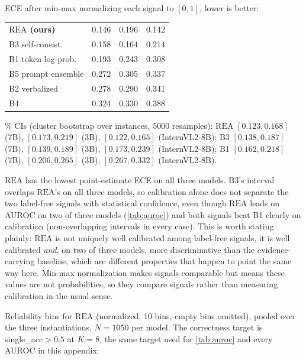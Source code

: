 \documentclass[11pt]{article}
\newcommand{\rea}{\mathrm{REA}}
\begin{document}
ECE after min-max normalizing each signal to $[0,1]$, lower is better:

\begin{center}
\footnotesize
\setlength{\tabcolsep}{3pt}
\begin{tabular}{@{}l S[table-format=1.3] S[table-format=1.3] S[table-format=1.3]@{}}
\toprule
{} & {} & {} & {} \\
\midrule
\textbf{$\rea$ (ours)} & 0.146 & 0.196 & 0.142 \\
B3 self-consist.    & 0.158 & 0.164 & 0.214 \\
B1 token log-prob.  & 0.193 & 0.243 & 0.308 \\
B5 prompt ensemble  & 0.272 & 0.305 & 0.337 \\
B2 verbalized       & 0.278 & 0.290 & 0.341 \\
B4 \citeauthor{khan2024consistency} & 0.324 & 0.330 & 0.388 \\
\bottomrule
\end{tabular}
\end{center}

\% CIs (cluster bootstrap over instances, 5000 resamples): $\rea$ $[0.123,0.168]$ (7B), $[0.173,0.219]$ (3B), $[0.122,0.165]$ (InternVL2-8B); B3 $[0.138,0.187]$ (7B), $[0.139,0.189]$ (3B), $[0.173,0.239]$ (InternVL2-8B); B1 $[0.162,0.218]$ (7B), $[0.206,0.265]$ (3B), $[0.267,0.332]$ (InternVL2-8B).

$\rea$ has the lowest point-estimate ECE on all three models. B3's interval overlaps $\rea$'s on all three models, so calibration alone does not separate the two label-free signals with statistical confidence, even though $\rea$ leads on AUROC on two of three models (\cref{tab:auroc}) and both signals beat B1 clearly on calibration (non-overlapping intervals in every case). This is worth stating plainly: $\rea$ is not uniquely well calibrated among label-free signals, it is well calibrated \emph{and}, on two of three models, more discriminative than the evidence-carrying baseline, which are different properties that happen to point the same way here. Min-max normalization makes signals comparable but means these values are not probabilities, so they compare signals rather than measuring calibration in the usual sense.

\noindent Reliability bins for $\rea$ (normalized, 10 bins, empty bins omitted), pooled over the three instantiations, $N{=}1050$ per model. The correctness target is single\_acc$>0.5$ at $K{=}8$, the same target used for \cref{tab:auroc} and every AUROC in this appendix:
\end{document}
